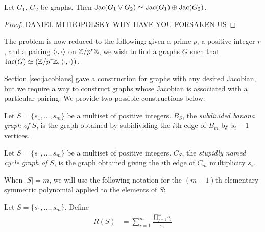\documentclass{amsart}
\begin{document}
\begin{prop}
  \label{prop:wedge_sum}
  Let $G_1$, $G_2$ be graphs. Then $\operatorname{Jac}(G_1 \vee G_2) \simeq
  \operatorname{Jac}(G_1) \oplus \operatorname{Jac}(G_2)$. 
\end{prop}
\begin{proof}
  DANIEL MITROPOLSKY WHY HAVE YOU FORSAKEN US
\end{proof}

The problem is now reduced to the following: given a prime $p$, a
positive integer $r$, and a pairing $\langle \cdot, \cdot \rangle$ on
$\mathbb{Z}/p^r\mathbb{Z}$, we wish to find a graphs $G$ such that $\operatorname{Jac}(G) \simeq
(\mathbb{Z}/p^r\mathbb{Z}, \langle \cdot, \cdot \rangle)$.

Section \ref{sec:jacobians} gave a construction for graphs with any
desired Jacobian, but we require a way to construct graphs whose
Jacobian is associated with a particular pairing. We provide two
possible constructions below:

\begin{defn}
  Let $S = \{s_1, \ldots, s_m\}$ be a multiset of positive
  integers. $B_S$, the \emph{subdivided banana graph of $S$}, is the
  graph obtained by subidividing the $i$th edge of $B_m$ by $s_i-1$
  vertices.
\end{defn}

\begin{defn}
  Let $S = \{s_1, \ldots, s_m\}$ be a multiset of positive
  integers. $C_S$, the \emph{stupidly named cycle graph of $S$}, is
  the graph obtained giving the $i$th edge of $C_m$ multiplicity
  $s_i$.
\end{defn}

When $|S| = m$, we will use the following notation for the $(m-1)$th
elementary symmetric polynomial applied to the elements of $S$:

\begin{defn}
  Let $S = \{s_1, \ldots, s_m\}$. Define
  \begin{align*}
    R(S) &= \sum_{i=1}^m\frac{\prod_{j=1}^ms_j}{s_i}
  \end{align*}
\end{defn}
\end{document}
